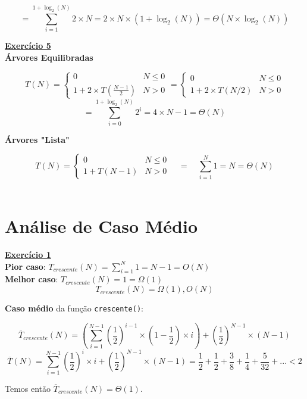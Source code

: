 \documentclass[a4paper,11pt]{article}
\begin{document}
	\[
		= \sum_{i=1}^{1 + \log_2(N)} 2 \times N = 2 \times N \times (1 + \log_2(N)) = \Theta(N \times \log_2(N))
	\]
	
	\noindent \underline{\textbf{Exercício 5}}\\
	
	\noindent \textbf{Árvores Equilibradas}
	
	\[
		T(N) = 
		\begin{cases}
			0 & N \leq 0 \\
			1 + 2 \times T(\frac{N-1}{2}) & N > 0
		\end{cases}
		=
		\begin{cases}
			0 & N \leq 0 \\
			1 + 2 \times T(N/2) & N > 0
		\end{cases}
	\]
	\[
		= \sum_{i=0}^{1 + \log_2(N)} 2^i = 4 \times N - 1 = \Theta(N)
	\]
	
	\noindent \textbf{Árvores "Lista"}
	
	\[
	T(N) = 
	\begin{cases}
		0 & N \leq 0 \\
		1 + T(N - 1) & N > 0
	\end{cases}
	\quad = \quad \sum_{i=1}^{N} 1 = N = \Theta(N)
	\]
	~
	
	
	\section{Análise de Caso Médio}
	
	
	\noindent \underline{\textbf{Exercício 1}}\\
	
	\noindent \textbf{Pior caso}: $ T_{crescente}(N) = \sum_{i=1}^{N} 1 = N - 1 = O(N) $\\
	
	\noindent \textbf{Melhor caso}: $ T_{crescente}(N) = 1 = \Omega(1) $\\
	\[
		T_{crescente}(N) = \Omega(1), O(N)
	\]
	
	\noindent \textbf{Caso médio} da função \texttt{crescente()}:
	
	\[
		\overline{T}_{crescente}(N) = (\sum_{i=1}^{N-1} (\frac{1}{2})^{i-1} \times (1-\frac{1}{2}) \times i) + (\frac{1}{2})^{N-1} \times (N - 1)
	\]
	\[
		\overline{T}(N) = \sum_{i=1}^{N-1} (\frac{1}{2})^i \times i + (\frac{1}{2})^{N-1} \times (N - 1) = \frac{1}{2} + \frac{1}{2} + \frac{3}{8} + \frac{1}{4} + \frac{5}{32} + ... < 2
	\]
	
	\noindent Temos então $ \overline{T}_{crescente}(N) = \Theta(1) $.\\
	
\end{document}
